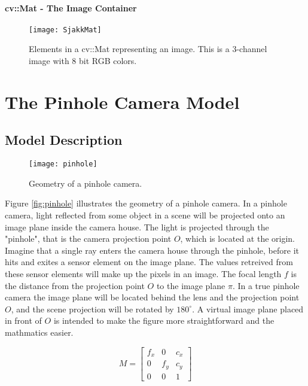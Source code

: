 \paragraph{cv::Mat - The Image Container}

\begin{figure}
\centering
\texttt{[image: SjakkMat]}
\caption{Elements in a cv::Mat representing an image. This is a 3-channel image with 8 bit RGB colors.}
\label{fig:matGrid}
\end{figure}

\section{The Pinhole Camera Model}

\subsection{Model Description}

\begin{wrapfigure}{r}{0.65\textwidth}
	\vspace{-10pt} %
	\centering
	\texttt{[image: pinhole]}
	\caption{\label{fig:pinhole}Geometry of a pinhole camera.}
	\vspace{-10pt} %
	\label{phantompic}
\end{wrapfigure}

Figure \ref{fig:pinhole} illustrates the geometry of a pinhole camera. In a pinhole camera, light reflected from some object in a scene will be projected onto an image plane inside the camera house. The light is projected through the "pinhole", that is the camera projection point $O$, which is located at the origin. Imagine that a single ray enters the camera house through the pinhole, before it hits and exites a sensor element on the image plane. The values retreived from these sensor elements will make up the pixels in an image. The focal length $f$ is the distance from the projection point $O$ to the image plane $\pi$. In a true pinhole camera the image plane will be located behind the lens and the projection point $O$, and the scene projection will be rotated by $180^{\circ}$. A virtual image plane placed in front of $O$ is intended to make the figure more straightforward and the mathmatics easier. 

\begin{equation}
M = \begin{bmatrix}
f_x & 0 & c_x \\
0 & f_y & c_y \\
0 & 0 & 1
\end{bmatrix}
\label{eq:pinhole}
\end{equation}

